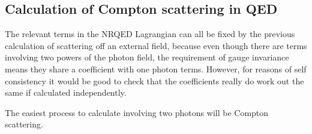 \subsection{Calculation of Compton scattering in QED}
The relevant terms in the NRQED Lagrangian can all be fixed by the previous calculation of scattering off an external field, because even though there are terms involving two powers of the photon field, the requirement of gauge invariance means they share a coefficient with one photon terms.  However, for reasons of self consistency it would be good to check that the coefficients really do work out the same if calculated independently.

The easiest process to calculate involving two photons will be Compton scattering.   


